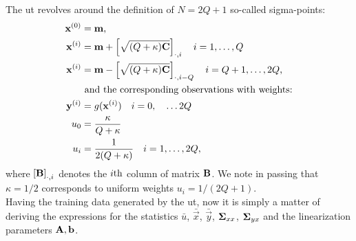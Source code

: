 \documentclass[11pt,a4paper]{article}
\newcommand{\ut}{{\sc ut}\xspace}
\newcommand{\x}{\vec{x}}
\newcommand{\y}{\vec{y}}
\renewcommand{\xi}{\x^{(i)}}
\newcommand{\yi}{\y^{(i)}}
\renewcommand{\b}{\vec{b}}
\newcommand{\xbar}{\bar{\x}}
\newcommand{\ybar}{\bar{\y}}
\newcommand{\Sigmaxx}{\mat{\Sigma}_{xx}}
\newcommand{\Sigmayx}{\mat{\Sigma}_{yx}}
\newcommand{\w}{u}
\newcommand{\wi}{u_i}
\newcommand{\wbar}{\bar{\w}}
\newcommand{\wo}{\w_0}
\newcommand{\m}{\vec{m}}
\newcommand{\xo}{\x^{(0)}}
\renewcommand{\Q}{Q}
\renewcommand{\k}{\kappa}
\newcommand{\mathcol}[2]{  \left[#1\right]_{\cdot, #2} }
\begin{document}
The \ut revolves around the definition of $N=2Q+1$ so-called sigma-points:
\begin{align}
	\xo & = \m \text{,} \\
	\xi &= \m + \mathcol{\sqrt{(\Q + \k) \C}}{i} \quad i = 1, \ldots, \Q \\
	\xi &= \m - \mathcol{\sqrt{(\Q + \k) \C}}{i-\Q} \quad i = \Q+1, \ldots, 2\Q \text{,} \\
& \text { and the corresponding observations with weights:} \\
	\yi & = g(\xi) \quad i = 0, \quad \ldots 2\Q\\
	\wo &= \frac{\k}{\Q + \k} \\
	\wi &= \frac{1}{2(\Q + \k)}  \quad  i = 1, \ldots, 2\Q  \text{,}
\end{align}	
where $\mathcol{\mat{B}}{i}$ denotes the $i\mathrm{th}$ column of matrix $\mathbf{B}$.
We note in passing that $\k=1/2$ corresponds to uniform weights $\wi = 1/(2\Q+1)$. \\

Having the training data generated by the \ut, now it is simply a matter of
deriving the expressions for the statistics $\wbar$, $\xbar$, $\ybar$, $\Sigmaxx$, $\Sigmayx$
and the linearization parameters $\A, \b$. 
\end{document}
